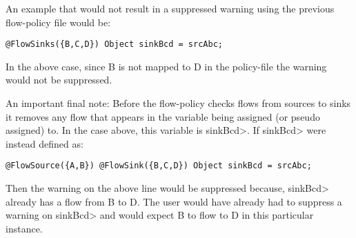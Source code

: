 An example that would not result in a suppressed warning
using the previous flow-policy file would be:

\begin{Verbatim}
@FlowSinks({B,C,D}) Object sinkBcd = srcAbc;
\end{Verbatim}

In the above case, since B is not mapped to D in the
policy-file the warning would not be suppressed.

An important final note:
Before the flow-policy checks flows from sources to sinks
it removes any flow that appears in the variable being assigned
(or pseudo assigned) to.  In the case above, this variable is
\<sinkBcd>.  If \<sinkBcd> were instead defined as:
\begin{Verbatim}
@FlowSource({A,B}) @FlowSink({B,C,D}) Object sinkBcd = srcAbc;
\end{Verbatim}
Then the warning on the above line would be suppressed because,
\<sinkBcd> already has a flow from B to D.  The user would have
already had to suppress a warning on \<sinkBcd> and would expect
B to flow to D in this particular instance.



